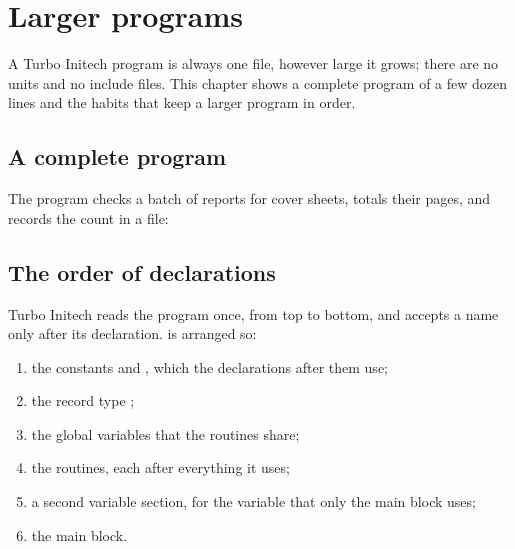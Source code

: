 \chapter{Larger programs}

A Turbo Initech program is always one file, however large it grows; there
are no units and no include files.  This chapter shows a complete program
of a few dozen lines and the habits that keep a larger program in order.

\section{A complete program}
The program  checks a batch of reports for cover sheets,
totals their pages, and records the count in a file:



\section{The order of declarations}
Turbo Initech reads the program once, from top to bottom, and accepts a
name only after its declaration.   is arranged so:

\begin{enumerate}
\item the constants  and , which the declarations
  after them use;
\item the record type ;
\item the global variables that the routines share;
\item the routines, each after everything it uses;
\item a second variable section, for the variable  that only the
  main block uses;
\item the main block.
\end{enumerate}

